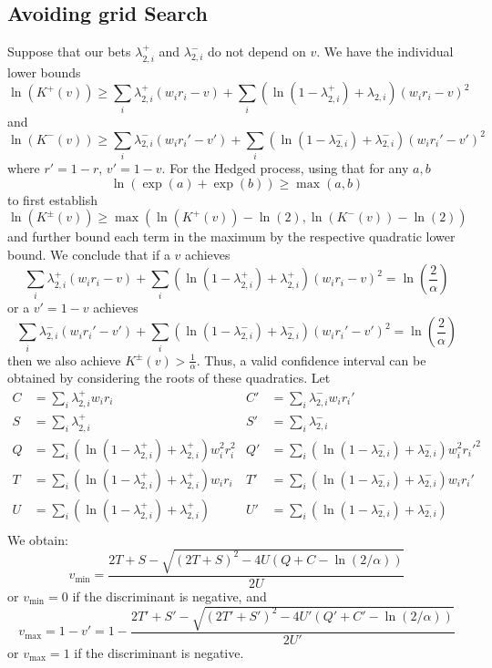 \subsection{Avoiding grid Search}
\label{app:nogrid1d}
Suppose that our bets $\lambda_{2,i}^{+}$ and $\lambda_{2,i}^{-}$ 
do not depend on $v$.
We have the individual lower bounds
\[
\ln(K^{+}(v)) \geq \sum_i \lambda_{2,i}^{+} (w_i r_i -v) + \sum_i (\ln(1-\lambda_{2,i}^{+})+\lambda_{2,i})(w_i r_i -v)^2
\]
and
\[
\ln(K^{-}(v)) \geq \sum_i \lambda_{2,i}^{-} (w_i r_i' -v') + \sum_i (\ln(1-\lambda_{2,i}^{-})+\lambda_{2,i}^{-})(w_i r_i' -v')^2
\]
where $r'=1-r$, $v'=1-v$.
For the Hedged process, using that for any $a,b$
\[
\ln\left(\exp(a)+\exp(b)\right)\geq \max(a,b)
\]
to first establish
\[
\ln(K^{\pm}(v)) \geq \max(\ln(K^{+}(v))-\ln(2),\ln(K^{-}(v))-\ln(2))
\]
and further bound each term in the maximum by the respective 
quadratic lower bound. We conclude that
if a $v$ achieves 
\[
\sum_i \lambda_{2,i}^{+} (w_i r_i -v) + \sum_i (\ln(1-\lambda_{2,i}^{+})+\lambda_{2,i}^{+})(w_i r_i -v)^2 = \ln\left(\frac{2}{\alpha}\right)
\]
or a $v'=1-v$ achieves 
\[
\sum_i \lambda_{2,i}^{-} (w_i r_i'-v') + \sum_i (\ln(1-\lambda_{2,i}^{-})+\lambda_{2,i}^{-})(w_i r_i' - v')^2
=\ln\left(\frac{2}{\alpha}\right)
\]
then we also achieve $K^{\pm}(v) > \frac{1}{\alpha}$. 
Thus, a valid confidence interval can be obtained by considering
the roots of these quadratics.  Let
\begin{align*}
C&=\sum_i \lambda_{2,i}^{+} w_i r_i & 
C'&=\sum_i \lambda_{2,i}^{-} w_i r_i'\\
S&=\sum_i \lambda_{2,i}^{+} & 
S'&=\sum_i \lambda_{2,i}^{-} \\
Q&=\sum_i \left(\ln(1-\lambda_{2,i}^{+})+\lambda_{2,i}^{+}\right) w_i^2 r_i^2 &
Q'&=\sum_i \left(\ln(1-\lambda_{2,i}^{-})+\lambda_{2,i}^{-}\right) w_i^2 r_i'^2\\
T&=\sum_i \left(\ln(1-\lambda_{2,i}^{+})+\lambda_{2,i}^{+}\right) w_ir_i &
T'&=\sum_i \left(\ln(1-\lambda_{2,i}^{-})+\lambda_{2,i}^{-}\right) w_ir_i'\\
U&=\sum_i \left(\ln(1-\lambda_{2,i}^{+})+\lambda_{2,i}^{+}\right) &
U'&=\sum_i \left(\ln(1-\lambda_{2,i}^{-})+\lambda_{2,i}^{-}\right)\\
\end{align*}
We obtain:
\[
v_{\min}= \frac{2T+S-\sqrt{(2T+S)^2-4U(Q+C-\ln(2/\alpha))}}{2U}
\]
or $v_{\min}=0$ if the discriminant is negative, 
and
\[
v_{\max}=1-v' = 1-\frac{2T'+S'-\sqrt{(2T'+S')^2-4U'(Q'+C'-\ln(2/\alpha))}}{2U'}
\]
or $v_{\max}=1$ if the discriminant is negative.

